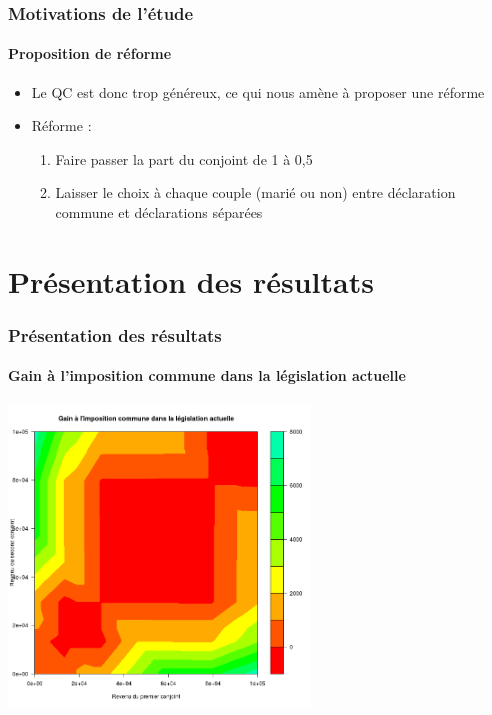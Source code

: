 \documentclass{beamer}
\begin{document}
\begin{frame}

\frametitle{Motivations de l'étude}

\framesubtitle{Proposition de réforme}

\begin{itemize}

\item Le QC est donc trop généreux, ce qui nous amène à proposer une réforme

\item Réforme :

\begin{enumerate}

\item Faire passer la part du conjoint de 1 à 0,5

\item Laisser le choix à chaque couple (marié ou non) entre déclaration commune et déclarations séparées

\end{enumerate}

\end{itemize}

\end{frame}

\section{Présentation des résultats}

\begin{frame}
\frametitle{Présentation des résultats}
\framesubtitle{Gain à l'imposition commune dans la législation actuelle}
\includegraphics[width=8cm]{GainImpComm1.png}
\end{frame}
\end{document}
